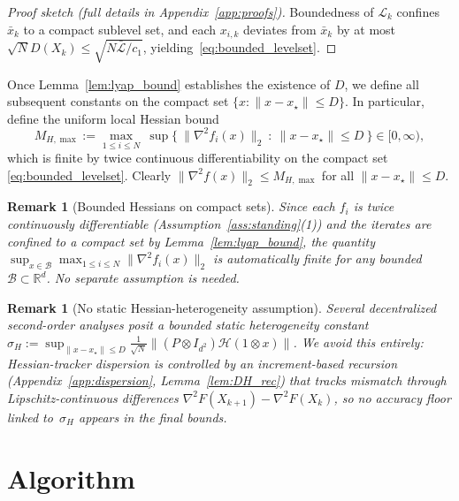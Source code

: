 \documentclass[11pt,a4paper]{article}
\def\one{1}%
\def\J{J}%
\def\Pmat{P}%
\newtheorem{remark}[theorem]{Remark}
\newcommand{\R}{\mathbb{R}}
\newcommand{\one}{\mathbf{1}}
\newcommand{\J}{\left(\frac{1}{N}\one\one^\top\right)}
\newcommand{\Pmat}{I-\J}
\begin{document}
\begin{proof}[Proof sketch (full details in Appendix~\ref{app:proofs})]
	Boundedness of $\mathcal L_k$ confines $\bar x_k$ to a compact sublevel set,
	and each $x_{i,k}$ deviates from $\bar x_k$ by at most
	$\sqrt{N}D(X_k)\le\sqrt{N\bar{\mathcal L}/c_1}$,
	yielding~\eqref{eq:bounded_levelset}.
	\end{proof}

	Once Lemma~\ref{lem:lyap_bound} establishes the existence of $D$,
	we define all subsequent constants on the compact set $\{x:\|x-x_\star\|\le D\}$.
	In particular, define the uniform local Hessian bound
	\begin{equation}\label{eq:MHmax_def}
		M_{H,\max}:=\max_{1\le i\le N}\ \sup\{\ \|\nabla^2 f_i(x)\|_2\ :\ \|x-x_\star\|\le D\ \}\in[0,\infty),
	\end{equation}
	which is finite by twice continuous differentiability on the compact set \eqref{eq:bounded_levelset}.
	Clearly $\|\nabla^2 f(x)\|_2\le M_{H,\max}$ for all $\|x-x_\star\|\le D$.

	\begin{remark}[Bounded Hessians on compact sets]
		Since each $f_i$ is twice continuously differentiable (Assumption~\ref{ass:standing}(1))
		and the iterates are confined to a compact set by Lemma~\ref{lem:lyap_bound},
		the quantity $\sup_{x\in\mathcal B}\max_{1\le i\le N}\|\nabla^2 f_i(x)\|_2$
		is automatically finite for any bounded $\mathcal B\subset\R^d$.
		No separate assumption is needed.
	\end{remark}

	\begin{remark}[No static Hessian-heterogeneity assumption]
		Several decentralized second-order analyses posit a bounded
		\emph{static} heterogeneity constant
		$\sigma_H:=\sup_{\|x-x_\star\|\le D}
		  \frac{1}{\sqrt N}\|(\Pmat\otimes I_{d^2})\mathcal H(\one\otimes x)\|$.
		We avoid this entirely: Hessian-tracker dispersion is controlled
		by an increment-based recursion
		(Appendix~\ref{app:dispersion}, Lemma~\ref{lem:DH_rec})
		that tracks mismatch through Lipschitz-continuous
		\emph{differences} $\nabla^2 F(X_{k+1})-\nabla^2 F(X_k)$,
		so no accuracy floor linked to~$\sigma_H$ appears in the
		final bounds.
	\end{remark}

	
	
\section{Algorithm}\label{sec:alg}
	
\end{document}
